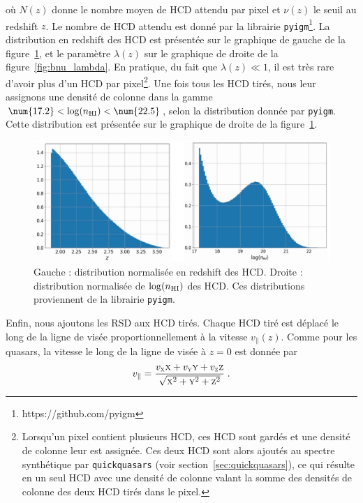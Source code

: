 où $N(z)$ donne le nombre moyen de HCD attendu par pixel et $\nu(z)$ le seuil au redshift $z$. Le nombre de HCD attendu est donné par la librairie \texttt{pyigm}\footnote{https://github.com/pyigm}. La distribution en redshift des HCD est présentée sur le graphique de gauche de la figure~\ref{fig:distrib_dla}, et le paramètre $\lambda(z)$ sur le graphique de droite de la figure~\ref{fig:bnu_lambda}. En pratique, du fait que $\lambda(z) \ll 1$, il est très rare d'avoir plus d'un HCD par pixel\footnote{Lorsqu'un pixel contient plusieurs HCD, ces HCD sont gardés et une densité de colonne leur est assignée. Ces deux HCD sont alors ajoutés au spectre synthétique par \texttt{quickquasars} (voir section~\ref{sec:quickquasars}), ce qui résulte en un seul HCD avec une densité de colonne valant la somme des densités de colonne des deux HCD tirés dans le pixel.}.
Une fois tous les HCD tirés, nous leur assignons une densité de colonne dans la gamme $\num{17.2} < \log(n_{\textsc{HI}}) < \num{22.5}$, selon la distribution donnée par \texttt{pyigm}. Cette distribution est présentée sur le graphique de droite de la figure~\ref{fig:distrib_dla}.
\begin{figure}
  \centering
  \includegraphics[scale=0.38]{distrib_dla}
  \caption{Gauche : distribution normalisée en redshift des HCD. Droite : distribution normalisée de $\log(n_{\textsc{HI}})$ des HCD. Ces distributions proviennent de la librairie \texttt{pyigm}.}
  \label{fig:distrib_dla}
\end{figure}
Enfin, nous ajoutons les RSD aux HCD tirés. Chaque HCD tiré est déplacé le long de la ligne de visée proportionnellement à la vitesse $v_{\parallel}(z)$. Comme pour les quasars, la vitesse le long de la ligne de visée à $z=0$ est donnée par
\begin{equation}
v_{\parallel} = \frac{v_{\textsc{x}} \textsc{x} + v_{\textsc{y}} \textsc{y} + v_{\textsc{z}} \textsc{z}}{\sqrt{\textsc{x}^2 + \textsc{y}^2 + \textsc{z}^2}} \; .
\end{equation}
